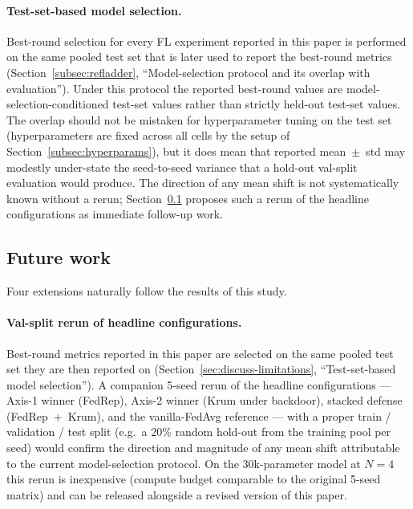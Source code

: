 \documentclass[preprint,12pt,authoryear]{elsarticle}
\begin{document}
\paragraph{Test-set-based model selection.}
Best-round selection for every FL experiment reported in this paper
is performed on the same pooled test set that is later used to
report the best-round metrics
(Section~\ref{subsec:refladder}, ``Model-selection protocol and
its overlap with evaluation''). Under this protocol the reported
best-round values are model-selection-conditioned test-set values
rather than strictly held-out test-set values. The overlap should
not be mistaken for hyperparameter tuning on the test set
(hyperparameters are fixed across all cells by the setup of
Section~\ref{subsec:hyperparams}), but it does mean that reported
mean~$\pm$~std may modestly under-state the seed-to-seed variance
that a hold-out val-split evaluation would produce. The direction
of any mean shift is not systematically known without a rerun;
Section~\ref{sec:discuss-future} proposes such a rerun of the
headline configurations as immediate follow-up work.

\subsection{Future work}
\label{sec:discuss-future}

Four extensions naturally follow the results of this study.

\paragraph{Val-split rerun of headline configurations.}
Best-round metrics reported in this paper are selected on the
same pooled test set they are then reported on
(Section~\ref{sec:discuss-limitations}, ``Test-set-based model
selection''). A companion 5-seed rerun of the headline
configurations --- Axis-1 winner (FedRep), Axis-2 winner (Krum
under backdoor), stacked defense (FedRep~$+$~Krum), and the
vanilla-FedAvg reference --- with a proper train / validation /
test split (e.g.\ a 20\% random hold-out from the training pool
per seed) would confirm the direction and magnitude of any mean
shift attributable to the current model-selection protocol. On
the 30k-parameter model at $N = 4$ this rerun is inexpensive
(compute budget comparable to the original 5-seed matrix) and
can be released alongside a revised version of this paper.
\end{document}
